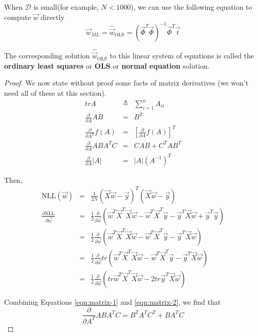 When $\mathcal{D}$ is small(for example, $N < 1000$), we can use the following equation to compute $\vec{w}$ directly
\begin{equation}
\vec{w}_{ML}=\hat{\vec{w}}_{\mathrm{OLS}}=(\vec{\Phi}^T\vec{\Phi})^{-1}\vec{\Phi}^T\vec{t}
\end{equation}

The corresponding solution $\hat{\vec{w}}_{\mathrm{OLS}}$ to this linear system of equations is called the \textbf{ordinary least squares} or \textbf{OLS} or \textbf{normal equation} solution.

\begin{proof}
We now state without proof some facts of matrix derivatives (we won’t need all of these at this section).
\begin{eqnarray}
trA &\triangleq& \sum\limits_{i=1}^n A_{ii} \nonumber \\
\frac{\partial}{\partial A}AB &=& B^T \\
\frac{\partial}{\partial A^T}f(A) &=& \left[\frac{\partial}{\partial A}f(A)\right]^T \label{eqn:matrix-1} \\
\frac{\partial}{\partial A}ABA^TC &=& CAB+C^TAB^T \label{eqn:matrix-2} \\
\frac{\partial}{\partial A}|A| &=& |A|(A^{-1})^T
\end{eqnarray}

Then,
\begin{eqnarray*}
\text{NLL}(\vec{w}) &=& \frac{1}{2N}(\vec{X}\vec{w}-\vec{y})^T(\vec{X}\vec{w}-\vec{y}) \\
\frac{\partial \text{NLL}}{\partial\vec{w}} &=& \frac{1}{2} \frac{\partial}{\partial\vec{w}} (\vec{w}^T\vec{X}^T\vec{X}\vec{w}-\vec{w}^T\vec{X}^T\vec{y}-\vec{y}^T\vec{X}\vec{w}+\vec{y}^T\vec{y}) \\
                           &=& \frac{1}{2} \frac{\partial}{\partial\vec{w}} (\vec{w}^T\vec{X}^T\vec{X}\vec{w}-\vec{w}^T\vec{X}^T\vec{y}-\vec{y}^T\vec{X}\vec{w}) \\
						   &=& \frac{1}{2} \frac{\partial}{\partial\vec{w}} tr(\vec{w}^T\vec{X}^T\vec{X}\vec{w}-\vec{w}^T\vec{X}^T\vec{y}-\vec{y}^T\vec{X}\vec{w}) \\
						   &=& \frac{1}{2} \frac{\partial}{\partial\vec{w}} (tr\vec{w}^T\vec{X}^T\vec{X}\vec{w}-2tr\vec{y}^T\vec{X}\vec{w})
\end{eqnarray*}

Combining Equations \ref{eqn:matrix-1} and \ref{eqn:matrix-2}, we find that 
\begin{equation*}
\frac{\partial}{\partial A^T}ABA^TC = B^TA^TC^T+BA^TC
\end{equation*}


\end{proof}
